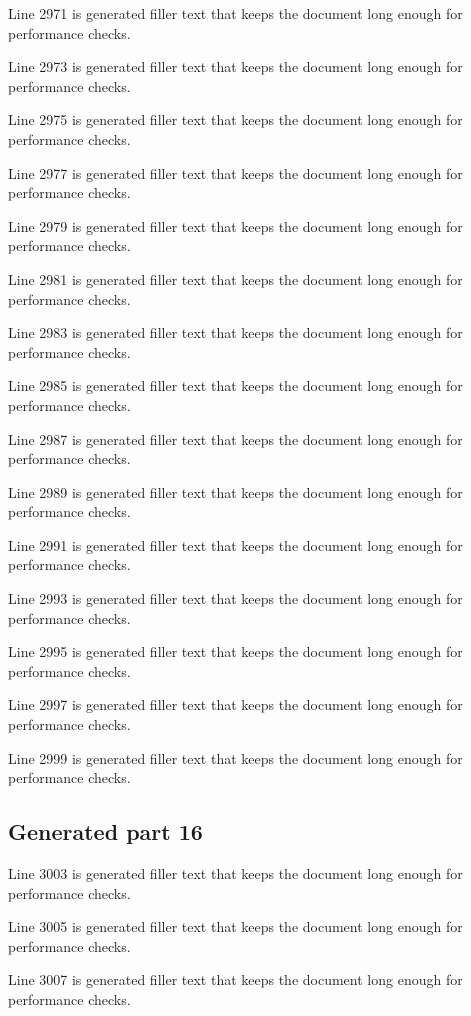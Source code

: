 Line 2971 is generated filler text that keeps the document long enough for performance checks.

Line 2973 is generated filler text that keeps the document long enough for performance checks.

Line 2975 is generated filler text that keeps the document long enough for performance checks.

Line 2977 is generated filler text that keeps the document long enough for performance checks.

Line 2979 is generated filler text that keeps the document long enough for performance checks.

Line 2981 is generated filler text that keeps the document long enough for performance checks.

Line 2983 is generated filler text that keeps the document long enough for performance checks.

Line 2985 is generated filler text that keeps the document long enough for performance checks.

Line 2987 is generated filler text that keeps the document long enough for performance checks.

Line 2989 is generated filler text that keeps the document long enough for performance checks.

Line 2991 is generated filler text that keeps the document long enough for performance checks.

Line 2993 is generated filler text that keeps the document long enough for performance checks.

Line 2995 is generated filler text that keeps the document long enough for performance checks.

Line 2997 is generated filler text that keeps the document long enough for performance checks.

Line 2999 is generated filler text that keeps the document long enough for performance checks.

\subsection{Generated part 16}

Line 3003 is generated filler text that keeps the document long enough for performance checks.

Line 3005 is generated filler text that keeps the document long enough for performance checks.

Line 3007 is generated filler text that keeps the document long enough for performance checks.

